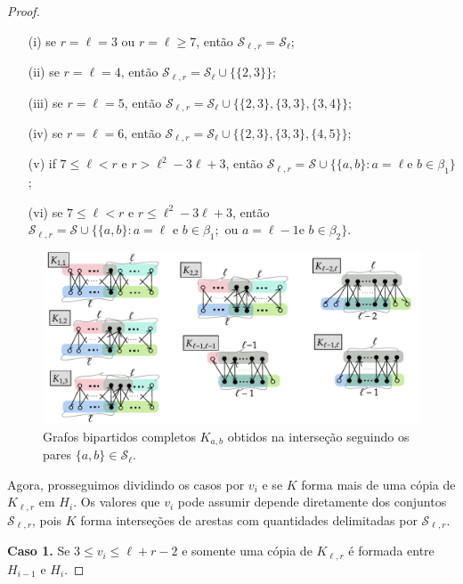 \documentclass[12pt,a4paper]{book}
\newcommand{\K}{K_{\ell,r}} %
\newcommand{\Slr}{\mathcal{S}_{\ell,r}} %
\begin{document}
\begin{proof}
      \begin{itemize}
      \item [(i)] se $r=\ell = 3$ ou $r=\ell \geq 7$, então
    $\mathcal{S}_{\ell,r} = \mathcal{S}_\ell$;
      \item [(ii)] se $r=\ell = 4$, então $\mathcal{S}_{\ell,r} =
    \mathcal{S}_\ell \cup\big\{\{2,3\}\big\}$;
      \item [(iii)] se $r=\ell = 5$, então $\mathcal{S}_{\ell,r} =
    \mathcal{S}_\ell \cup\big\{\{2,3\},\{3,3\},\{3,4\}\big\}$;
      \item [(iv)] se $r=\ell = 6$, então $\mathcal{S}_{\ell,r} =
    \mathcal{S}_\ell \cup\big\{\{2,3\},\{3,3\},\{4,5\}\big\}$;
      \item[(v)] if $7 \leq \ell < r \text{ e } r > \ell^2-3\ell+3$,
    então $\mathcal{S}_{\ell,r} = \mathcal{S} \cup \{\{a,b\}: a=\ell\text{
    e }b\in \beta_1\}$;
       \item[(vi)] se $7 \leq \ell < r \text{ e } r \leq
    \ell^2-3\ell+3$, então $\mathcal{S}_{\ell,r} = \mathcal{S} \cup
    \{\{a,b\}: a=\ell\text{ e }b\in \beta_1;\text{ ou }a=\ell-1\text{
    e }b\in \beta_2\}$.
      \end{itemize}

     \begin{figure}[htb] \centering 
      \includegraphics[]{Kll-inter.pdf}
       \caption{Grafos bipartidos completos $K_{a,b}$ obtidos na interseção seguindo os pares $\{a,b\} \in\mathcal{S}_\ell$.}
       \label{fig:configKLL}
     \end{figure}

    Agora, prosseguimos dividindo os casos por $v_i$ e se $K$ forma mais de uma cópia de $\K$ em $H_i$. 
    Os valores que $v_i$ pode assumir depende diretamente dos conjuntos $\Slr$, pois $K$ forma interseções de arestas com quantidades delimitadas por $\Slr$.
    
    \medskip \textbf{Caso 1.}
	Se $3 \leq v_i \leq \ell+r-2$ e somente uma cópia de $\K$ é formada entre $H_{i-1}$ e $H_i$.
   

\end{proof}
\end{document}
